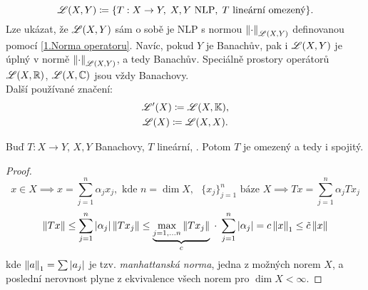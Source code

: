 \begin{definition}
$$
    \mathscr{L}(X, Y)
    \coloneqq
    \{
        T: X \to Y, \;
        X,Y \text{ NLP}, \;
        T \text{ lineární omezený}
    \}.
$$
Lze ukázat, že $\mathscr{L}(X, Y)$ sám o sobě je NLP s normou $\left\lVert\cdot\right\rVert_{\mathscr{L}(X,Y)}$ definovanou pomocí \ref{1.Norma operatoru}. Navíc, pokud $Y$ je Banachův, pak i $\mathscr{L}(X, Y)$ je úplný v normě $\left\lVert\cdot\right\rVert_{\mathscr{L}(X,Y)}$, a tedy Banachův. Speciálně prostory operátorů $\mathscr{L}(X, \mathbb{R})$, $\mathscr{L}(X, \mathbb{C})$ jsou vždy Banachovy.
\\
Další používané značení:
\begin{gather*}
    \mathscr{L}'(X) \coloneqq \mathscr{L}(X, \mathbb{K}), \\
    \mathscr{L}(X) \coloneqq \mathscr{L}(X, X).
\end{gather*}
\end{definition}

\begin{theorem}
Buď $T: X \to Y$, $X,Y$ Banachovy, $T$ lineární, . Potom $T$ je omezený a tedy i spojitý.
\end{theorem}
\begin{proof}
$$
    x \in X
    \implies
    x = \sum_{j=1}^n \alpha_j x_j, \text{ kde } n = \dim X, \text{ } \{ x_j \}_{j=1}^n \text{ báze } X
    \implies
    Tx = \sum_{j=1}^n \alpha_j T x_j
$$
$$
    \left\lVert Tx\right\rVert
    \leq
    \sum_{j=1}^n |\alpha_j| \left\lVert Tx_j\right\rVert
    \leq
    \underbrace{
        \underset{j=1,\dots n}{\max} \left\lVert Tx_j\right\rVert
    }_{c}
    \; \cdot \;
    \sum_{j=1}^n |\alpha_j|
    =
    c \left\lVert x\right\rVert_1
    \leq
    \Tilde{c} \left\lVert x\right\rVert
$$
kde $\left\lVert a\right\rVert_1 = \sum |a_j|$ je tzv. \textit{manhattanská norma}, jedna z možných norem $X$, a poslední nerovnost plyne z ekvivalence všech norem pro $\dim X < \infty$.
\end{proof}

